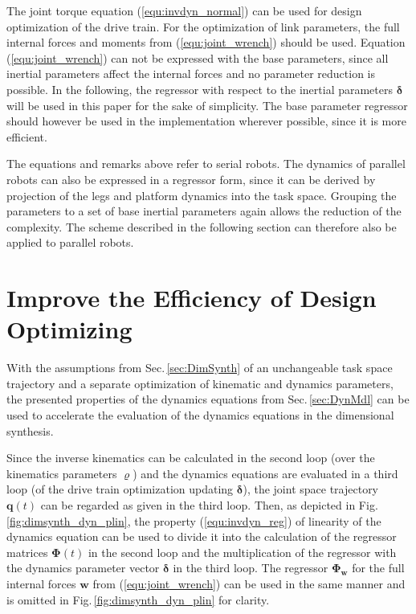 \documentclass{svproc}
\newcommand{\bm}[1]{\boldsymbol{#1}}
\begin{document}
The joint torque equation (\ref{equ:invdyn_normal}) can be used for design optimization of the drive train.
For the optimization of link parameters, the full internal forces and moments from (\ref{equ:joint_wrench}) should be used.
Equation (\ref{equ:joint_wrench}) can not be expressed with the base parameters, since all inertial parameters affect the internal forces and no parameter reduction is possible.
In the following, the regressor with respect to the inertial parameters $\bm{\delta}$ will be used in this paper for the sake of simplicity.
The base parameter regressor should however be used in the implementation wherever possible, since it is more efficient.

The equations and remarks above refer to serial robots.
The dynamics of parallel robots can also be expressed in a regressor form, since it can be derived by projection of the legs and platform dynamics into the task space.
Grouping the parameters to a set of base inertial parameters again allows the reduction of the complexity.
The scheme described in the following section can therefore also be applied to parallel robots.

\newpage

\section{Improve the Efficiency of Design Optimizing}
\label{sec:DesOptImprove}

With the assumptions from Sec.\,\ref{sec:DimSynth} of an unchangeable task space trajectory and a separate optimization of kinematic and dynamics parameters, the presented properties of the dynamics equations from Sec.\,\ref{sec:DynMdl} can be used to accelerate the evaluation of the dynamics equations in the dimensional synthesis.

Since the inverse kinematics can be calculated in the second loop (over the kinematics parameters $\bm{\varrho}$) and the dynamics equations are evaluated in a third loop (of the drive train optimization updating $\bm{\delta}$), the joint space trajectory $\bm{q}(t)$ can be regarded as given in the third loop.
Then, as depicted in Fig.\,\ref{fig:dimsynth_dyn_plin}, the property (\ref{equ:invdyn_reg}) of linearity of the dynamics equation can be used to divide it into the calculation of the regressor matrices $\bm{\Phi}(t)$ in the second loop and the multiplication of the regressor with the dynamics parameter vector  $\bm{\delta}$ in the third loop.
The regressor $\bm{\Phi}_{\bm{w}}$ for the full internal forces $\bm{w}$ from (\ref{equ:joint_wrench}) can be used in the same manner and is omitted in Fig.\,\ref{fig:dimsynth_dyn_plin} for clarity.
\end{document}
